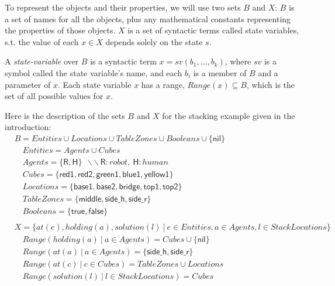 To represent the objects and their properties, we will use two sets $B$ and $X$: $B$ is a set of names for all the objects, plus any mathematical constants representing the properties of those objects. $X$ is a set of syntactic terms called state variables, s.t. the value of each $x \in X$ depends solely on the state $s$.

A \textit{state-variable} over $B$ is a syntactic term $x = sv(b_1, ..., b_k)$, where $sv$ is a symbol called the state variable's name, and each $b_i$ is a member of $B$ and a parameter of $x$. Each state variable $x$ has a range, $\textit{Range}(x) \subseteq B$, which is the set of all possible values for $x$.


Here is the description of the sets $B$ and $X$ for the stacking example given in the introduction:
{\small
\begin{align*}
&B           = Entities \cup Locations \cup TableZones \cup Booleans \cup \{\textsf{nil}\} \\
&\quad Entities    = Agents \cup Cubes\\
&\quad Agents      = \{ \textsf{R}, \textsf{H} \} ~~ \backslash\backslash~\textsf{R}:robot,~\textsf{H}:human\\
&\quad Cubes     = \{ \textsf{red1}, \textsf{red2}, \textsf{green1}, \textsf{blue1}, \textsf{yellow1} \}\\
&\quad Locations     = \{ \textsf{base1}, \textsf{base2}, \textsf{bridge}, \textsf{top1}, \textsf{top2} \}\\
&\quad TableZones     = \{ \textsf{middle}, \textsf{side\_h}, \textsf{side\_r} \}\\
&\quad Booleans    = \{ \textsf{true},\textsf{false} \}\\
&\\
&X = \{ at(e), holding(a), solution(l) ~ | ~ e \in Entities, a \in Agents, l \in StackLocations\}\\
&\quad \textit{Range}(holding(a) ~|~ a \in Agents) = Cubes \cup \{\textsf{nil}\} \\
&\quad \textit{Range}(at(a) ~|~ a \in Agents) = \{ \textsf{side\_h}, \textsf{side\_r} \}\\
&\quad \textit{Range}(at(c) ~|~ c \in Cubes) = TableZones \cup Locations\\
&\quad \textit{Range}(solution(l) ~|~ l \in StackLocations) = Cubes \\
\end{align*}
}


